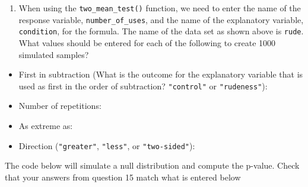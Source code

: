 \documentclass[
]{report}
\providecommand{\tightlist}{%
  \setlength{\itemsep}{0pt}\setlength{\parskip}{0pt}}
\begin{document}
\newpage

\begin{enumerate}
\def\labelenumi{\arabic{enumi}.}
\setcounter{enumi}{14}
\tightlist
\item
  When using the \texttt{two\_mean\_test()} function, we need to enter the name of the response variable, \texttt{number\_of\_uses}, and the name of the explanatory variable, \texttt{condition}, for the formula. The name of the data set as shown above is \texttt{rude}. What values should be entered for each of the following to create 1000 simulated samples?
\end{enumerate}

\begin{itemize}
\tightlist
\item
  First in subtraction (What is the outcome for the explanatory variable that is used as first in the order of subtraction? \texttt{"control"} or \texttt{"rudeness"}):
\end{itemize}

\vspace{.2in}

\begin{itemize}
\tightlist
\item
  Number of repetitions:
\end{itemize}

\vspace{.2in}

\begin{itemize}
\tightlist
\item
  As extreme as:
\end{itemize}

\vspace{.2in}

\begin{itemize}
\tightlist
\item
  Direction (\texttt{"greater"}, \texttt{"less"}, or \texttt{"two-sided"}):
\end{itemize}

\vspace{.2in}

The code below will simulate a null distribution and compute the p-value. Check that your answers from question 15 match what is entered below
\end{document}
